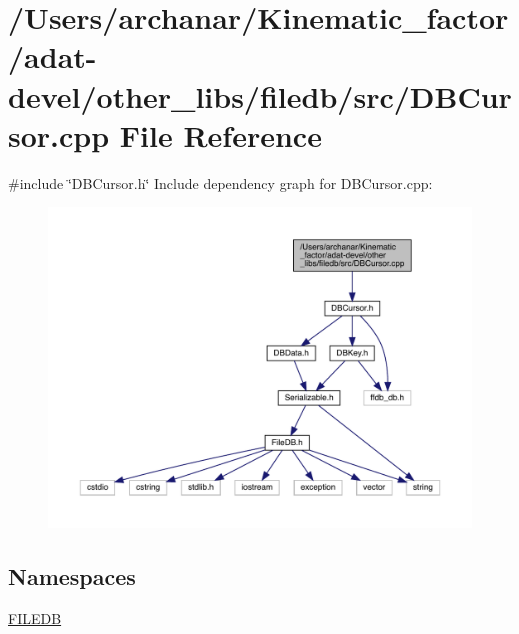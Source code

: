 \hypertarget{adat-devel_2other__libs_2filedb_2src_2DBCursor_8cpp}{}\section{/\+Users/archanar/\+Kinematic\+\_\+factor/adat-\/devel/other\+\_\+libs/filedb/src/\+D\+B\+Cursor.cpp File Reference}
\label{adat-devel_2other__libs_2filedb_2src_2DBCursor_8cpp}
{\ttfamily \#include \char`\"{}D\+B\+Cursor.\+h\char`\"{}}\newline
Include dependency graph for D\+B\+Cursor.\+cpp\+:
\nopagebreak
\begin{figure}[H]
\begin{center}
\leavevmode
\includegraphics[width=350pt]{d3/d44/adat-devel_2other__libs_2filedb_2src_2DBCursor_8cpp__incl}
\end{center}
\end{figure}
\subsection*{Namespaces}
\begin{DoxyCompactItemize}
\item 
 \mbox{\hyperlink{namespaceFILEDB}{F\+I\+L\+E\+DB}}
\end{DoxyCompactItemize}
